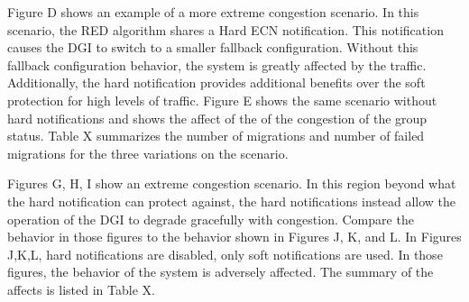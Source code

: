 Figure D shows an example of a more extreme congestion scenario.
In this scenario, the \ac{RED} algorithm shares a Hard \ac{ECN} notification.
This notification causes the \ac{DGI} to switch to a smaller fallback configuration.
Without this fallback configuration behavior, the system is greatly affected by the traffic.
Additionally, the hard notification provides additional benefits over the soft protection for high levels of traffic.
Figure E shows the same scenario without hard notifications and shows the affect of the of the congestion of the group status.
Table X summarizes the number of migrations and number of failed migrations for the three variations on the scenario.

Figures G, H, I show an extreme congestion scenario.
In this region beyond what the hard notification can protect against, the hard notifications instead allow the operation of the \ac{DGI} to degrade gracefully with congestion.
Compare the behavior in those figures to the behavior shown in Figures J, K, and L.
In Figures J,K,L, hard notifications are disabled, only soft notifications are used.
In those figures, the behavior of the system is adversely affected.
The summary of the affects is listed in Table X.
